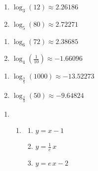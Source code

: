 \documentclass{ximera}
\begin{document}
\begin{multicols}{2}
\begin{enumerate}
\setcounter{enumi}{\value{HW}}

\item $\log_{3}(12) \approx 2.26186$
\item $\log_{5}(80) \approx 2.72271$

\setcounter{HW}{\value{enumi}}
\end{enumerate}
\end{multicols}

\begin{multicols}{2}
\begin{enumerate}
\setcounter{enumi}{\value{HW}}

\item $\log_{6}(72) \approx 2.38685$
\item $\log_{4}\left(\frac{1}{10}\right) \approx -1.66096$

\setcounter{HW}{\value{enumi}}
\end{enumerate}
\end{multicols}

\begin{multicols}{2}
\begin{enumerate}
\setcounter{enumi}{\value{HW}}
\item $\log_{\frac{3}{5}}(1000) \approx -13.52273$
\item $\log_{\frac{2}{3}}(50) \approx -9.64824$

\setcounter{HW}{\value{enumi}}
\end{enumerate}
\end{multicols}


\begin{enumerate}
\setcounter{enumi}{\value{HW}}

\addtocounter{enumi}{7}

\item   \begin{enumerate} \addtocounter{enumii}{3}  \item \begin{multicols}{3} \begin{enumerate}

\item  $y = x - 1$

\item  $y = \frac{1}{e} \, x$

\item $y = e \, x -2$

\end{enumerate}

\end{multicols}

\end{enumerate}

\setcounter{HW}{\value{enumi}}
\end{enumerate}
\end{document}
